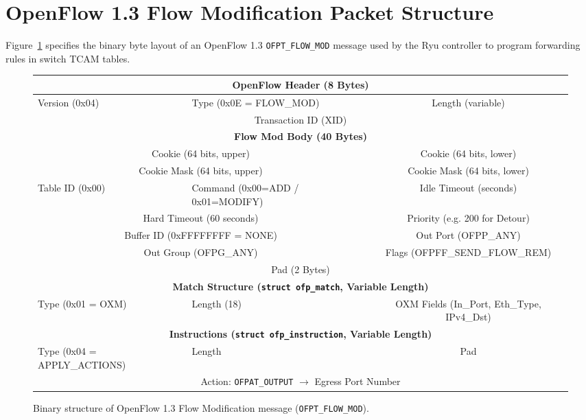\section{OpenFlow 1.3 Flow Modification Packet Structure}
Figure~\ref{fig:ofp_flow_mod_binary} specifies the binary byte layout of an OpenFlow 1.3 \texttt{OFPT\_FLOW\_MOD} message used by the Ryu controller to program forwarding rules in switch TCAM tables.

\begin{figure}[H]
  \centering
  \scriptsize\ttfamily
  \setlength{\tabcolsep}{2.5pt}
  \begin{tabular}{|p{}|p{}|p{}|p{}|}
    \hline
    \multicolumn{4}{|c|}{\textbf{OpenFlow Header (8 Bytes)}}\\
    \hline
    Version (0x04) & Type (0x0E = FLOW\_MOD) & \multicolumn{2}{c|}{Length (variable)}\\
    \hline
    \multicolumn{4}{|c|}{Transaction ID (XID)}\\
    \hline
    \multicolumn{4}{|c|}{\textbf{Flow Mod Body (40 Bytes)}}\\
    \hline
    \multicolumn{2}{|c|}{Cookie (64 bits, upper)} & \multicolumn{2}{c|}{Cookie (64 bits, lower)}\\
    \hline
    \multicolumn{2}{|c|}{Cookie Mask (64 bits, upper)} & \multicolumn{2}{c|}{Cookie Mask (64 bits, lower)}\\
    \hline
    Table ID (0x00) & Command (0x00=ADD / 0x01=MODIFY) & \multicolumn{2}{c|}{Idle Timeout (seconds)}\\
    \hline
    \multicolumn{2}{|c|}{Hard Timeout (60 seconds)} & \multicolumn{2}{c|}{Priority (e.g. 200 for Detour)}\\
    \hline
    \multicolumn{2}{|c|}{Buffer ID (0xFFFFFFFF = NONE)} & \multicolumn{2}{c|}{Out Port (OFPP\_ANY)}\\
    \hline
    \multicolumn{2}{|c|}{Out Group (OFPG\_ANY)} & \multicolumn{2}{c|}{Flags (OFPFF\_SEND\_FLOW\_REM)}\\
    \hline
    \multicolumn{4}{|c|}{Pad (2 Bytes)}\\
    \hline
    \multicolumn{4}{|c|}{\textbf{Match Structure (\texttt{struct ofp\_match}, Variable Length)}}\\
    \hline
    Type (0x01 = OXM) & Length (18) & \multicolumn{2}{c|}{OXM Fields (In\_Port, Eth\_Type, IPv4\_Dst)}\\
    \hline
    \multicolumn{4}{|c|}{\textbf{Instructions (\texttt{struct ofp\_instruction}, Variable Length)}}\\
    \hline
    Type (0x04 = APPLY\_ACTIONS) & Length & \multicolumn{2}{c|}{Pad}\\
    \hline
    \multicolumn{4}{|c|}{Action: \texttt{OFPAT\_OUTPUT} $\to$ Egress Port Number}\\
    \hline
  \end{tabular}
  \caption{Binary structure of OpenFlow 1.3 Flow Modification message (\texttt{OFPT\_FLOW\_MOD}).}
  \label{fig:ofp_flow_mod_binary}
\end{figure}

